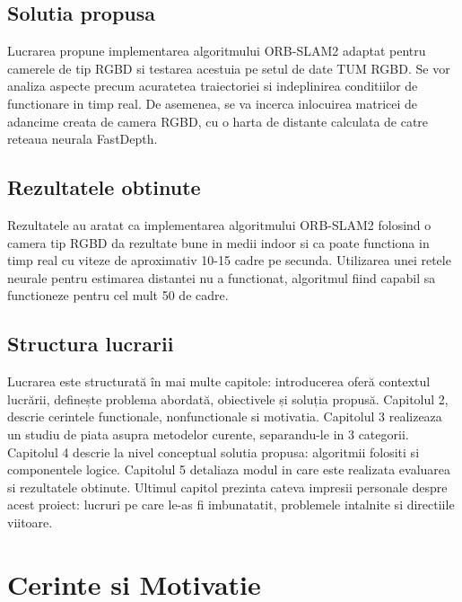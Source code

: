 \documentclass[12pt,a4paper]{report}
\begin{document}
\section{Solutia propusa}
Lucrarea propune implementarea algoritmului ORB-SLAM2 adaptat pentru camerele de tip RGBD
si testarea acestuia pe setul de date TUM RGBD\cite{tum}. Se vor analiza aspecte precum acuratetea 
traiectoriei si indeplinirea conditiilor de functionare in timp real. De asemenea, se va 
incerca inlocuirea matricei de adancime creata de camera RGBD, cu o harta de distante 
calculata de catre reteaua neurala FastDepth\cite{fastdepth}.  

\section{Rezultatele obtinute}
Rezultatele au aratat ca implementarea algoritmului ORB-SLAM2 folosind o camera tip RGBD 
da rezultate bune in medii indoor si ca poate functiona in timp real cu viteze de aproximativ
10{-}15 cadre pe secunda. Utilizarea unei retele neurale pentru estimarea distantei nu a 
functionat, algoritmul fiind capabil sa functioneze pentru cel mult 50 de cadre.  

\section{Structura lucrarii}
Lucrarea este structurată în mai multe capitole: introducerea oferă contextul lucrării,
definește problema abordată, obiectivele și soluția propusă. Capitolul 2, descrie 
cerintele functionale, nonfunctionale si motivatia.
Capitolul 3 realizeaza un studiu de piata asupra metodelor curente, separandu-le in 3
categorii. Capitolul 4 descrie la nivel conceptual solutia propusa: algoritmii folositi si componentele logice.
Capitolul 5 detaliaza modul in care este realizata evaluarea si rezultatele obtinute.
Ultimul capitol prezinta cateva impresii personale despre acest proiect: lucruri pe 
care le-as fi imbunatatit, problemele intalnite si directiile viitoare. 

\chapter{Cerinte si Motivatie}
\end{document}
